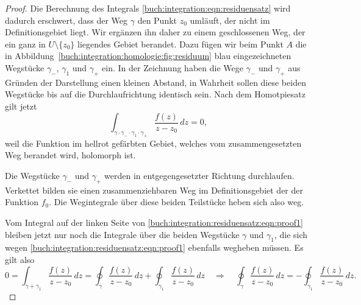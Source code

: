 \begin{proof}
Die Berechnung des Integrals
\eqref{buch:integration:eqn:residuensatz}
wird dadurch erschwert, dass der Weg $\gamma$ den Punkt $z_0$
umläuft, der nicht im Definitionsgebiet liegt.
Wir ergänzen ihn daher zu einem geschlossenen Weg, der ein
ganz in $U\setminus\{z_0\}$ liegendes Gebiet berandet.
Dazu fügen wir beim Punkt $A$ die in 
Abbildung~\ref{buch:integration:homologie:fig:residuum}
blau eingezeichneten Wegstücke $\gamma_-$, $\gamma_1$ und $\gamma_+$ 
ein.
In der Zeichnung haben die Wege $\gamma_-$ und $\gamma_+$ aus Gründen
der Darstellung einen kleinen Abstand, in Wahrheit sollen diese beiden
Wegstücke bis auf die Durchlaufrichtung identisch sein.
Nach dem Homotpiesatz gilt jetzt
\begin{equation}
\int_{\gamma
\cdot
\gamma_-
\cdot
\gamma_1
\cdot
\gamma_+
}
\frac{f(z)}{z-z_0}\,dz
=
0,
\label{buch:integration:residuensatz:eqn:proof1}
\end{equation}
weil die Funktion im hellrot gefärbten Gebiet, welches vom zusammengesetzten
Weg berandet wird, holomorph ist.

Die Wegstücke $\gamma_-$ und $\gamma_+$ werden in entgegengesetzter 
Richtung durchlaufen.
Verkettet bilden sie einen zusammenziehbaren Weg im Definitionsgebiet
der der Funktion $f_0$.
Die Wegintegrale über diese beiden Teilstücke heben sich also weg.

Vom Integral auf der linken Seite von
\eqref{buch:integration:residuensatz:eqn:proof1}
bleiben jetzt nur noch die Integrale über die beiden Wegstücke
$\gamma$ und $\gamma_1$,
die sich wegen \eqref{buch:integration:residuensatz:eqn:proof1}
ebenfalls wegheben müssen.
Es gilt also
\begin{equation}
0
=
\int_{\gamma+\gamma_1}
\frac{f(z)}{z-z_0}
\,dz
=
\oint_{\gamma}
\frac{f(z)}{z-z_0}
\,dz
+
\oint_{\gamma_1}
\frac{f(z)}{z-z_0}
\,dz
\quad\Rightarrow\quad
\oint_\gamma
\frac{f(z)}{z-z_0}
\,dz
=
-
\oint_{\gamma_1}
\frac{f(z)}{z-z_0}
\,dz.
\label{buch:integration:residuensatz:eqn:proof2}
\end{equation}


\end{proof}

